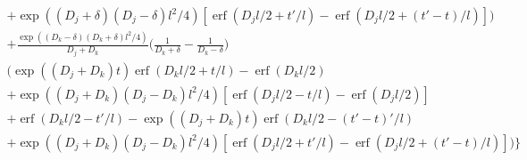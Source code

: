 \documentclass[a4paper]{article}
\newcommand{\erf}{\operatorname{erf}}
\begin{document}
\begin{multline}
  + \exp((D_j + \delta)(D_j - \delta)l^2/4)[\erf(D_j l/2 + t'/l) -
  \erf(D_j l/2 + (t'-t)/l)]
  \bigg) \\
  +
  \frac{\exp((D_k-\delta)(D_k+\delta)l^2/4)}{D_j + D_k}
  \bigg(\frac{1}{D_k+\delta} - \frac{1}{D_k-\delta} \bigg) \\
  \bigg(
  \exp((D_j + D_k) t) \erf(D_k l/2 + t/l) - \erf(D_k l / 2) \\
  + \exp((D_j + D_k)(D_j - D_k)l^2/4)[\erf(D_j l/2 - t/l) -
  \erf(D_j l/2)] \\
  + \erf(D_k l / 2 - t'/l) - 
  \exp((D_j + D_k) t) \erf(D_k l / 2 - (t'-t)'/l) \\
  + \exp((D_j + D_k)(D_j - D_k)l^2/4)[\erf(D_j l/2 + t'/l) -
  \erf(D_j l/2 + (t'-t)/l)]
  \bigg)
  \bigg\} \\
\end{multline}
\end{document}
